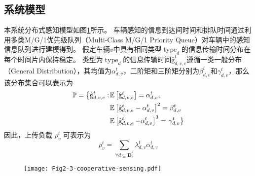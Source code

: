 \subsection{系统模型}
本系统分布式感知模型如图\ref{fig 2-3}所示。
车辆感知的信息到达间时间和排队时间通过利用多类M/G/1优先级队列（Multi-Class M/G/1 Priority Queue）\cite{qian2020minimizing}对车辆中的感知信息队列进行建模得到。
假定车辆$v$中具有相同类型$\operatorname{type}_d$的信息传输时间分布在每个时间片内保持稳定。
类型为$\operatorname{type}_d$的信息传输时间$\operatorname{\hat{g}}_{d, v, e}^t$遵循一类一般分布（General Distribution），其均值为$\alpha_{d, v}^t$，二阶矩和三阶矩分别为$\beta_{d, v}^t$和$\gamma_{d, v}^t$，那么该分布集合可以表示为
\begin{align}
	\mathbb{P}=\left\{\hat{\mathrm{g}}_{d, v, e}^t:\right. & \mathbb{E}\left[\hat{\mathrm{g}}_{d, v, e}^t\right]=\alpha_{d, v}^t, \notag \\
	& \mathbb{E}\left[\hat{\mathrm{g}}_{d, v, e}^t-\alpha_{d, v}^t\right]^2=\beta_{d, v}^t \notag \\
	& \mathbb{E}\left[\operatorname{\hat{g}}_{d, v, e}^t-\alpha_{d, v}^t\right]^{3}=\left.\gamma_{d, v}^t \right\}
\end{align}
因此，上传负载 $\rho_{v}^{t}$ 可表示为 
\begin{equation}
    \rho_{v}^{t}=\sum_{\forall d \subseteq \mathbf{D}_v^t} \lambda_{d,v}^{t}  \alpha_{d, v}^t
\end{equation}

\begin{figure}[h]
\centering
  \texttt{[image: Fig2-3-cooperative-sensing.pdf]}
  \label{fig 2-3}
\end{figure}

